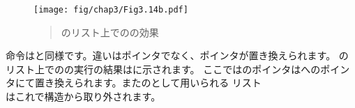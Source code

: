 \begin{figure}[tp]
\label{Figure 3.14}
\centering
\begin{comment}
\heading{Figure 3.14:} Effect of \code{(define z (cons y (cdr x)))} on the lists in \link{Figure 3.12}.

\begin{example}
     +---+---+     +---+---+     +---+---+
x -->| * | *-+---->| * | *-+---->| * | / |
     +-|-+---+ +-->+-|-+---+     +-|-+---+
       |       |     V             V
       |       |   +---+         +---+
       |       |   | c |         | d |
       |       |   +---+         +---+
       |       |   +---+---+     +---+---+
       +-------+-->| * | *-+---->| * | / |
               |   +-|-+---+     +-|-+---+
     +---+---+ |     V             V
z -->| * | *-+-+   +---+         +---+
     +-|-+---+     | a |         | b |
       |           +---+         +---+
       +---------->+---+---+     +---+---+
                   | * | *-+---->| * | / |
              y -->+-|-+---+     +-|-+---+
                     V             V
                   +---+         +---+
                   | e |         | f |
                   +---+         +---+
\end{example}
\end{comment}
\texttt{[image: fig/chap3/Fig3.14b.pdf]}
\begin{quote}
 のリスト上でのの効果
\end{quote}
\end{figure}

\clearpage


\noindent
{}命令はと同様です。違いはポインタでなく、ポインタが置き換えられます。
のリスト上でのの実行の結果はに示されます。
ここではのポインタはへのポインタにて置き換えられます。またのとして用いられる
リスト\\はこれで構造から取り外されます。

\enlargethispage{\baselineskip}

